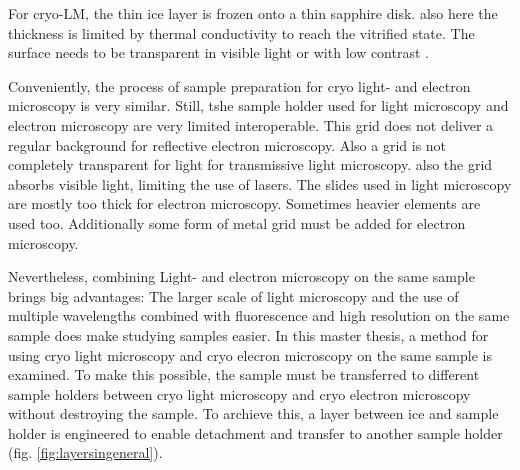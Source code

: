 For cryo-LM, the thin ice layer is frozen onto a thin sapphire disk. also here the thickness is limited by thermal conductivity to reach the vitrified state. The surface needs to be transparent in visible light or with low contrast \cite{Faoro.2018}.

Conveniently, the process of sample preparation for cryo light- and electron microscopy is very similar. Still, tshe sample holder used for light microscopy and electron microscopy are very limited interoperable. This grid does not deliver a regular background for reflective electron microscopy. Also a grid is not completely transparent for light for transmissive light microscopy. also the grid absorbs visible light, limiting the use of lasers. The slides used in light microscopy are mostly too thick for electron microscopy. Sometimes heavier elements are used too. Additionally some form of metal grid must be added for electron microscopy. 


Nevertheless, combining Light- and electron microscopy on the same sample brings big advantages: The larger scale of light microscopy and the use of multiple wavelengths combined with fluorescence and high resolution on the same sample does make studying samples easier. In this master thesis, a method for using cryo light microscopy and cryo elecron microscopy on the same sample is examined. To make this possible, the sample must be transferred to different sample holders between cryo light microscopy and cryo electron microscopy without destroying the sample. To archieve this, a layer between ice and sample holder is engineered to enable detachment and transfer to another sample holder (fig. \ref{fig:layersingeneral}).

